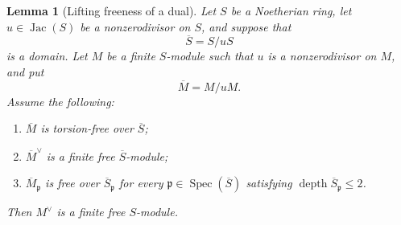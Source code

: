 \documentclass[reqno]{amsart}
\theoremstyle{plain}
\newtheorem{lemma}[theorem]{Lemma}
\theoremstyle{definition}
\newcommand{\Spec}{\operatorname{Spec}}
\newcommand{\Jac}{\operatorname{Jac}}
\newcommand{\depth}{\operatorname{depth}}
\begin{document}
\begin{lemma}[Lifting freeness of a dual]
\label{lem:lifting-dual}
Let $S$ be a Noetherian ring, let $u\in\Jac(S)$ be a nonzerodivisor on
$S$, and suppose that
\[
  \overline S=S/uS
\]
is a domain.  Let $M$ be a finite $S$-module such that $u$ is a
nonzerodivisor on $M$, and put
\[
  \overline M=M/uM.
\]
Assume the following:
\begin{enumerate}[label=\textup{(\roman*)}]
  \item $\overline M$ is torsion-free over $\overline S$;
  \item $\overline M^\vee$ is a finite free $\overline S$-module;
  \item $\overline M_{\mathfrak p}$ is free over
  $\overline S_{\mathfrak p}$ for every
  $\mathfrak p\in\Spec(\overline S)$ satisfying
  $\depth\overline S_{\mathfrak p}\leq 2$.
\end{enumerate}
Then $M^\vee$ is a finite free $S$-module.
\end{lemma}
\end{document}
